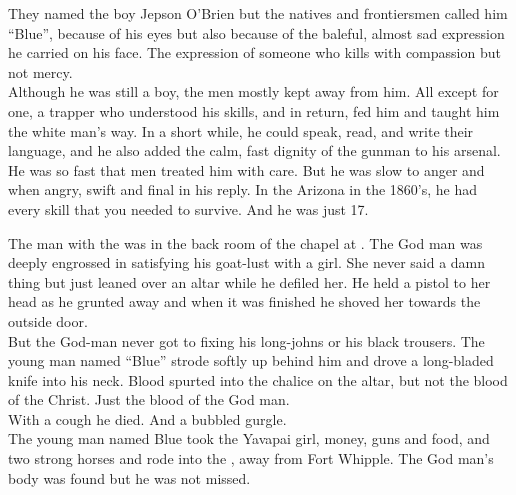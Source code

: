 They named the boy Jepson O'Brien but the natives and frontiersmen called him ``Blue'', because of his eyes but also because of the baleful, almost sad expression he carried on his face. The expression of someone who kills with compassion but not mercy. \\

Although he was still a boy, the men mostly kept away from him. All except for one, a trapper who understood his skills, and in return, fed him and taught him the white man's way. In a short while, he could speak, read, and write their language, and he also added the calm, fast dignity of the gunman to his arsenal. \\

He was so fast that men treated him with care. But he was slow to anger and when angry, swift and final in his reply. In the Arizona  in the 1860's, he had every skill that you needed to survive. And he was just 17. \\





The  man with the  was in the back room of the chapel at . The God man was deeply engrossed in satisfying his goat-lust with a  girl. She never said a damn thing but just leaned over an altar while he defiled her. He held a pistol to her head as he grunted away and when it was finished he shoved her towards the outside door. \\

But the God-man never got to fixing his long-johns or his black trousers. The young man named ``Blue'' strode softly up behind him and drove a long-bladed knife into his neck. Blood spurted into the chalice on the altar, but not the blood of the Christ. Just the blood of the God man. \\

With a cough he died. And a bubbled gurgle. \\

The young man named Blue took the Yavapai girl, money, guns and food, and two strong horses and rode into the , away from Fort Whipple. The God man's body was found but he was not missed. \\

